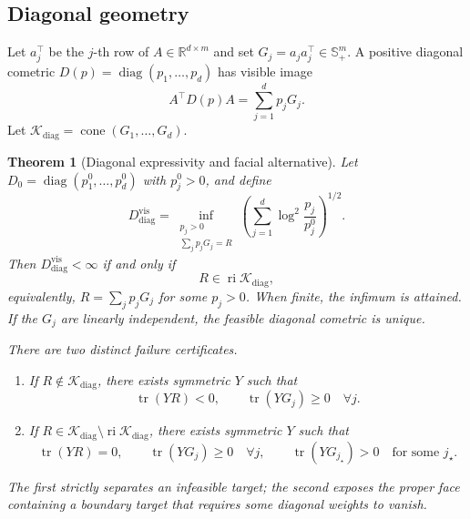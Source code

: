 \documentclass[10pt]{article}
\theoremstyle{plain}
\newtheorem{theorem}{Theorem}[section]
\theoremstyle{definition}
\theoremstyle{remark}
\newcommand{\R}{\mathbb R}
\newcommand{\PSD}{\mathbb S_{+}}
\newcommand{\tr}{\operatorname{tr}}
\newcommand{\diag}{\operatorname{diag}}
\newcommand{\ri}{\operatorname{ri}}
\newcommand{\cone}{\operatorname{cone}}
\newcommand{\Kcal}{\mathcal K}
\begin{document}
\subsection{Diagonal geometry}

Let \(a_j^\top\) be the \(j\)-th row of \(A\in\R^{d\times m}\) and set
\(G_j=a_ja_j^\top\in\PSD^m\).  A positive diagonal cometric
\(D(p)=\diag(p_1,\ldots,p_d)\) has visible image
\begin{equation}
  A^\top D(p)A=\sum_{j=1}^d p_jG_j.
  \label{eq:diagonal-image}
\end{equation}
Let \(\Kcal_{\mathrm{diag}}=\cone(G_1,\ldots,G_d)\).

\begin{theorem}[Diagonal expressivity and facial alternative]
\label{thm:diagonal-expressivity}
Let \(D_0=\diag(p_1^0,\ldots,p_d^0)\) with \(p_j^0>0\), and define
\begin{equation}
  D_{\mathrm{diag}}^{\mathrm{vis}}
  =
  \inf_{\substack{p_j>0\\\sum_jp_jG_j=R}}
  \left(\sum_{j=1}^d\log^2\frac{p_j}{p_j^0}\right)^{1/2}.
  \label{eq:diagonal-complexity}
\end{equation}
Then \(D_{\mathrm{diag}}^{\mathrm{vis}}<\infty\) if and only if
\begin{equation}
  R\in\ri\Kcal_{\mathrm{diag}},
  \label{eq:diagonal-ri}
\end{equation}
equivalently, \(R=\sum_jp_jG_j\) for some \(p_j>0\).  When finite, the
infimum is attained.  If the \(G_j\) are linearly independent, the feasible
diagonal cometric is unique.

There are two distinct failure certificates.
\begin{enumerate}[label=(\roman*),leftmargin=*]
  \item If \(R\notin\Kcal_{\mathrm{diag}}\), there exists symmetric \(Y\)
  such that
  \[
    \tr(YR)<0,
    \qquad
    \tr(YG_j)\ge0\quad\forall j.
  \]
  \item If
  \(R\in\Kcal_{\mathrm{diag}}\setminus\ri\Kcal_{\mathrm{diag}}\), there
  exists symmetric \(Y\) such that
  \[
    \tr(YR)=0,
    \qquad
    \tr(YG_j)\ge0\quad\forall j,
    \qquad
    \tr(YG_{j_\star})>0\quad\text{for some }j_\star.
  \]
\end{enumerate}
The first strictly separates an infeasible target; the second exposes the
proper face containing a boundary target that requires some diagonal weights
to vanish.
\end{theorem}
\end{document}
